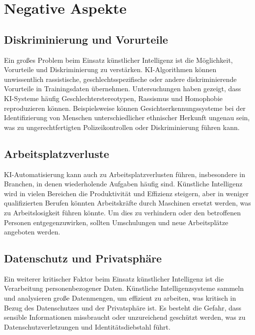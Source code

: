 \section{Negative Aspekte}
\subsection{Diskriminierung und Vorurteile}
Ein großes Problem beim Einsatz künstlicher Intelligenz ist die Möglichkeit, Vorurteile und Diskriminierung zu verstärken. KI-Algorithmen können unwissentlich rassistische, geschlechtsspezifische oder andere diskriminierende Vorurteile in Trainingsdaten übernehmen. Untersuchungen haben gezeigt, dass KI-Systeme häufig Geschlechterstereotypen, Rassismus und Homophobie reproduzieren können. Beispielsweise können Gesichtserkennungssysteme bei der Identifizierung von Menschen unterschiedlicher ethnischer Herkunft ungenau sein, was zu ungerechtfertigten Polizeikontrollen oder Diskriminierung führen kann.
\subsection{Arbeitsplatzverluste}
KI-Automatisierung kann auch zu Arbeitsplatzverlusten führen, insbesondere in Branchen, in denen wiederholende Aufgaben häufig sind. Künstliche Intelligenz wird in vielen Bereichen die Produktivität und Effizienz steigern, aber in weniger qualifizierten Berufen könnten Arbeitskräfte durch Maschinen ersetzt werden, was zu Arbeitslosigkeit führen könnte. Um dies zu verhindern oder den betroffenen Personen entgegenzuwirken, sollten Umschulungen und neue Arbeitsplätze angeboten werden.
\subsection{Datenschutz und Privatsphäre}
Ein weiterer kritischer Faktor beim Einsatz künstlicher Intelligenz ist die Verarbeitung personenbezogener Daten. Künstliche Intelligenzsysteme sammeln und analysieren große Datenmengen, um effizient zu arbeiten, was kritisch in Bezug des Datenschutzes und der Privatsphäre ist. Es besteht die Gefahr, dass sensible Informationen missbraucht oder unzureichend geschützt werden, was zu Datenschutzverletzungen und Identitätsdiebstahl führt.

